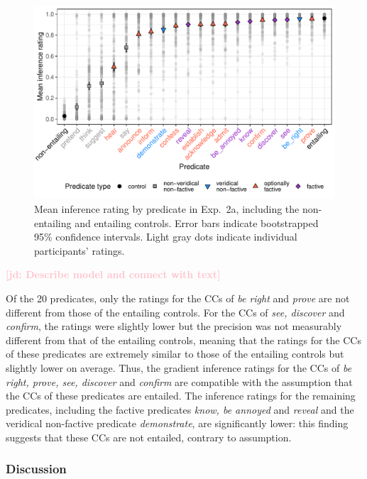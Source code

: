 \documentclass[11pt,fleqn]{article}
\newcommand{\jd}[1]{\textbf{\textcolor{Pink}{[jd: #1]}}}
\newcommand{\6}{\mbox{$[\hspace*{-.6mm}[$}}
\newcommand{\9}{\mbox{$]\hspace*{-.6mm}]$}}
\begin{document}
\begin{figure}[h!]
\centering

\includegraphics[width=.7\paperwidth]{../../results/4-veridicality3/graphs/means-inference-by-predicate-variability}

\caption{Mean inference rating by predicate in Exp.~2a, including the non-entailing and entailing controls. Error bars indicate bootstrapped 95\% confidence intervals. Light gray dots indicate individual participants' ratings.} 
\label{f-veridicality-predicate}
\end{figure}

\jd{Describe model and connect with text} 

Of the 20 predicates, only the ratings for the CCs of {\em be right} and {\em prove} are not different from those of the entailing controls. For the CCs of {\em see, discover} and {\em confirm}, the ratings were slightly lower but the precision was not measurably different from that of the entailing controls, meaning that the ratings for the CCs of these predicates are extremely similar to those of the entailing controls but slightly lower on average. Thus, the gradient inference ratings for the CCs of {\em be right, prove, see, discover} and {\em confirm} are compatible with the assumption that the CCs of these predicates are entailed. The inference ratings for the remaining predicates, including the factive predicates {\em know, be annoyed} and {\em reveal} and the veridical non-factive predicate {\em demonstrate}, are significantly lower: this finding suggests that these CCs are not entailed, contrary to assumption. 



\subsubsection{Discussion}
\end{document}
